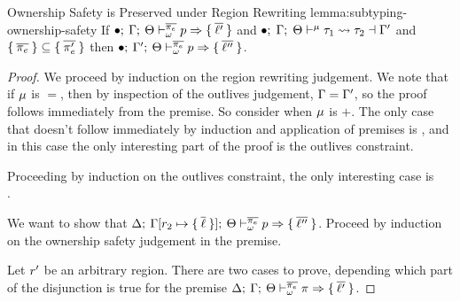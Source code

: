 \begin{oxlemma}{Ownership Safety is Preserved under Region Rewriting}
  {lemma:subtyping-ownership-safety} If $\bullet; \: \Gamma; \: \Theta \vdash^{\overline{\pi_e}}_{\omega} p \Rightarrow \{ \: \overline{\ell^\prime} \: \}$ and
  $\bullet; \; \Gamma; \; \Theta \vdash^{\mu} \tau_1 \leadsto \tau_2 \dashv \Gamma^\prime$ and
  $\{ \: \overline{\pi_e} \: \} \subseteq \{ \: \overline{\pi_e^\prime} \: \}$ then
  $\bullet; \: \Gamma^\prime; \: \Theta \vdash^{\overline{\pi_e}}_{\omega} p \Rightarrow \{ \: \overline{\ell^{\prime\prime}} \: \}$.
\end{oxlemma}
\begin{proof}
  We proceed by induction on the region rewriting judgement. We note that if
  $\mu$ is $=$, then by inspection of the outlives judgement, $\Gamma
  = \Gamma^\prime$, so the proof follows immediately from the premise. So
  consider when $\mu$ is $+$. The only case that doesn't follow
  immediately by induction and application of premises is ,
  and in this case the only interesting part of the proof is the outlives
  constraint.

  Proceeding by induction on the outlives constraint, the only interesting case
  is \\ .

  \vspace{1em}
  \noindent \framebox[\textwidth]{ \figuresize
    \begin{mathpar}
      \UCombineLocalProvs
    \end{mathpar}
  } \vspace{1em}

  We want to show that $\Delta; \: \Gamma[r_2 \mapsto \{ \: \overline{\ell} \: \}]; \: \Theta \vdash^{\overline{\pi_e}}_{\omega} p \Rightarrow \{ \: \overline{\ell^{\prime\prime}} \: \}$.
  Proceed by induction on the ownership safety judgement in the premise.

  \vspace{1em}
  \noindent \framebox[\textwidth]{ \figuresize
    \begin{mathpar}
      \OSafePlace
    \end{mathpar}
  } \vspace{1em}

  Let $r^\prime$ be an arbitrary region. There are two cases to prove,
  depending which part of the disjunction is true for the premise
  $\Delta; \: \Gamma; \: \Theta \vdash^{\overline{\pi_e}}_{\omega} \pi \Rightarrow \{ \: \overline{\ell^\prime} \: \}$.


\end{proof}
